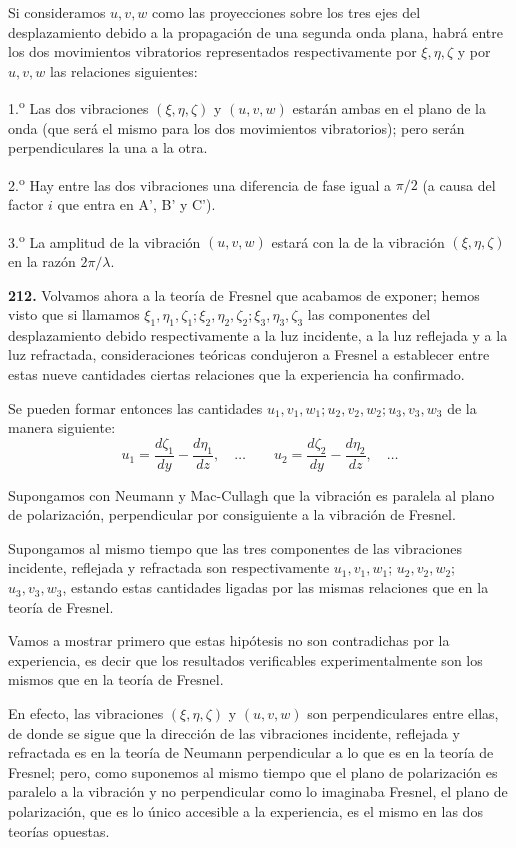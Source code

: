 Si consideramos $u,v,w$ como las proyecciones sobre los tres ejes del
desplazamiento debido a la propagación de una segunda onda plana, habrá
entre los dos movimientos vibratorios representados respectivamente por
$\xi,\eta,\zeta$ y por $u,v,w$ las relaciones siguientes:

1.\textsuperscript{o} Las dos vibraciones $(\xi,\eta,\zeta)$ y $(u,v,w)$ estarán ambas
en el plano de la onda (que será el mismo para los dos movimientos
vibratorios); pero serán perpendiculares la una a la otra.

2.\textsuperscript{o} Hay entre las dos vibraciones una diferencia de fase igual a
$\pi/2$ (a causa del factor $i$ que entra en A', B' y C').

3.\textsuperscript{o} La amplitud de la vibración $(u,v,w)$ estará con la de la
vibración $(\xi,\eta,\zeta)$ en la razón $2\pi/\lambda$.

\noindent\textbf{212.} Volvamos ahora a la teoría de Fresnel que acabamos
de exponer; hemos visto que si llamamos
$\xi_1,\eta_1,\zeta_1;\xi_2,\eta_2,\zeta_2;\xi_3,\eta_3,\zeta_3$ las
componentes del desplazamiento debido respectivamente a la luz incidente,
a la luz reflejada y a la luz refractada, consideraciones teóricas
condujeron a Fresnel a establecer entre estas nueve cantidades ciertas
relaciones que la experiencia ha confirmado.

Se pueden formar entonces las cantidades $u_1,v_1,w_1;u_2,v_2,w_2;
u_3,v_3,w_3$ de la manera siguiente:
\[
u_1=\frac{d\zeta_1}{dy}-\frac{d\eta_1}{dz},\quad\ldots
\qquad
u_2=\frac{d\zeta_2}{dy}-\frac{d\eta_2}{dz},\quad\ldots
\]

Supongamos con Neumann y Mac-Cullagh que la vibración es paralela al
plano de polarización, perpendicular por consiguiente a la vibración de
Fresnel.

Supongamos al mismo tiempo que las tres componentes de las vibraciones
incidente, reflejada y refractada son respectivamente $u_1,v_1,w_1$;
$u_2,v_2,w_2$; $u_3,v_3,w_3$, estando estas cantidades ligadas por las mismas
relaciones que en la teoría de Fresnel.

Vamos a mostrar primero que estas hipótesis no son contradichas por la
experiencia, es decir que los resultados verificables experimentalmente
son los mismos que en la teoría de Fresnel.

En efecto, las vibraciones $(\xi,\eta,\zeta)$ y $(u,v,w)$ son
perpendiculares entre ellas, de donde se sigue que la dirección de las
vibraciones incidente, reflejada y refractada es en la teoría de Neumann
perpendicular a lo que es en la teoría de Fresnel; pero, como suponemos al
mismo tiempo que el plano de polarización es paralelo a la vibración y no
perpendicular como lo imaginaba Fresnel, el plano de polarización, que es
lo único accesible a la experiencia, es el mismo en las dos teorías
opuestas.

